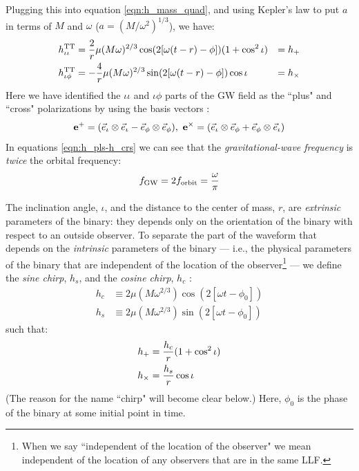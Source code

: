 Plugging this into equation \ref{eqn:h_mass_quad}, and using Kepler's law to put $a$ in terms of $M$ and $\omega$ ($a = \left(M/\omega^2\right)^{1/3}$), we have:
\begin{subequations}
\label{eqn:h_pls-h_crs}
\begin{align}
h^{\mathrm{TT}}_{\iota\iota} &= \frac{2}{r}\mu (M \omega)^{2/3} \cos(2[\omega (t-r) - \phi])(1 + \cos^2\iota) &= h_{+} \\
h^{\mathrm{TT}}_{\iota\phi}  &= -\frac{4}{r} \mu (M\omega)^{2/3} \sin(2[\omega (t-r) - \phi])\cos\iota &= h_{\times}
\end{align}
\end{subequations}
Here we have identified the $\iota\iota$ and $\iota\phi$ parts of the \ac{GW} field as the ``plus" and ``cross" polarizations by using the basis vectors \cite{ref:BlanfordThorne}:
\begin{equation}
\mathbf{e}^{+} = (\vec{e}_{\iota} \otimes \vec{e}_{\iota} - \vec{e}_{\phi} \otimes \vec{e}_{\phi}), ~ \mathbf{e}^{\times} = (\vec{e}_{\iota} \otimes \vec{e}_{\phi} + \vec{e}_{\phi} \otimes \vec{e}_{\iota})
\end{equation}
In equations \ref{eqn:h_pls-h_crs} we can see that the \emph{gravitational-wave frequency} is \emph{twice} the orbital frequency:
\begin{equation}
\label{eqn:f_GW}
\fGW = 2 f_{\mathrm{orbit}} = \frac{\omega}{\pi}
\end{equation}

The inclination angle, $\iota$, and the distance to the center of mass, $r$, are \emph{extrinsic} parameters of the binary: they depends only on the orientation of the binary with respect to an outside observer. To separate the part of the waveform that depends on the \emph{intrinsic} parameters of the binary --- i.e., the physical parameters of the binary that are independent of the location of the observer\footnote{When we say ``independent of the location of the observer" we mean independent of the location of any observers that are in the same \ac{LLF}.} --- we define the \emph{sine chirp}, $h_s$, and the \emph{cosine chirp}, $h_c$ \cite{ref:Brown}:
\begin{subequations}
\label{eqn:cos_sin_chirp}
\begin{align}
h_c &\equiv 2 \mu (M \omega^{2/3}) \cos(2[\omega t - \phi_0] ) \\
h_s &\equiv 2 \mu (M \omega^{2/3}) \sin(2[\omega t - \phi_0] )
\end{align}
\end{subequations}
such that:
\begin{align}
h_{+} &= \frac{h_c}{r} (1 + \cos^2\iota) \\
h_{\times} &= \frac{h_s}{r} \cos\iota
\end{align}
(The reason for the name ``chirp" will become clear below.) Here, $\phi_0$ is the phase of the binary at some initial point in time.

